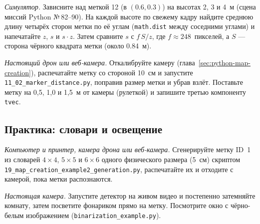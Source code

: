 \begin{taskbox}
\emph{Симулятор.} Зависните над меткой 12 (в $(0.6, 0.3)$) на высотах 2, 3 и 4~м (сцена миссий Python №\,82--90). На каждой высоте по свежему кадру найдите среднюю длину четырёх сторон метки по её углам (\verb|math.dist| между соседними углами) и напечатайте $z$, $s$ и $s \cdot z$. Затем сравните $s$ с $f\,S/z$, где $f \approx 248$~пикселей, а $S$ --- сторона чёрного квадрата метки (около 0.84~м).
\end{taskbox}

\begin{taskbox}
\emph{Настоящий дрон или веб-камера.} Откалибруйте камеру (глава~\ref{sec:python-map-creation}), распечатайте метку со стороной 10~см и запустите \texttt{11\_02\_marker\_distance.py}, поправив размер метки и убрав взлёт. Поставьте метку на 0,5, 1,0 и 1,5~м от камеры (рулеткой) и запишите третью компоненту \verb|tvec|.
\end{taskbox}

\subsection{Практика: словари и освещение}

\begin{taskbox}
\emph{Компьютер и принтер, камера дрона или веб-камера.} Сгенерируйте метку ID~1 из словарей $4 \times 4$, $5 \times 5$ и $6 \times 6$ одного физического размера (5~см) скриптом \verb|19_map_creation_example2_generation.py|, распечатайте их и отходите с камерой, пока метки распознаются.
\end{taskbox}

\begin{taskbox}
\emph{Настоящая камера.} Запустите детектор на живом видео и постепенно затемняйте комнату, затем посветите фонариком прямо на метку. Посмотрите окно с чёрно-белым изображением (\verb|binarization_example.py|).
\end{taskbox}

